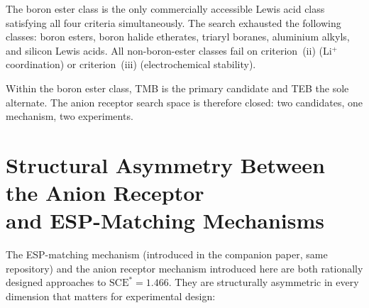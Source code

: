 \documentclass[11pt]{article}
\theoremstyle{plain}
\theoremstyle{definition}
\theoremstyle{remark}
\begin{document}
The boron ester class is the only commercially accessible Lewis acid
class satisfying all four criteria simultaneously.  The search exhausted
the following classes: boron esters, boron halide etherates, triaryl
boranes, aluminium alkyls, and silicon Lewis acids.  All non-boron-ester
classes fail on criterion~(ii) (Li$^+$ coordination) or
criterion~(iii) (electrochemical stability).

Within the boron ester class, TMB is the primary candidate and TEB the
sole alternate.  The anion receptor search space is therefore closed:
two candidates, one mechanism, two experiments.

\section{Structural Asymmetry Between the Anion Receptor\\
and ESP-Matching Mechanisms}
\label{sec:asymmetry}

The ESP-matching mechanism (introduced in the companion paper, same
repository) and the anion receptor mechanism introduced here are both
rationally designed approaches to $\mathrm{SCE}^{*} = 1.466$.  They
are structurally asymmetric in every dimension that matters for
experimental design:
\end{document}

